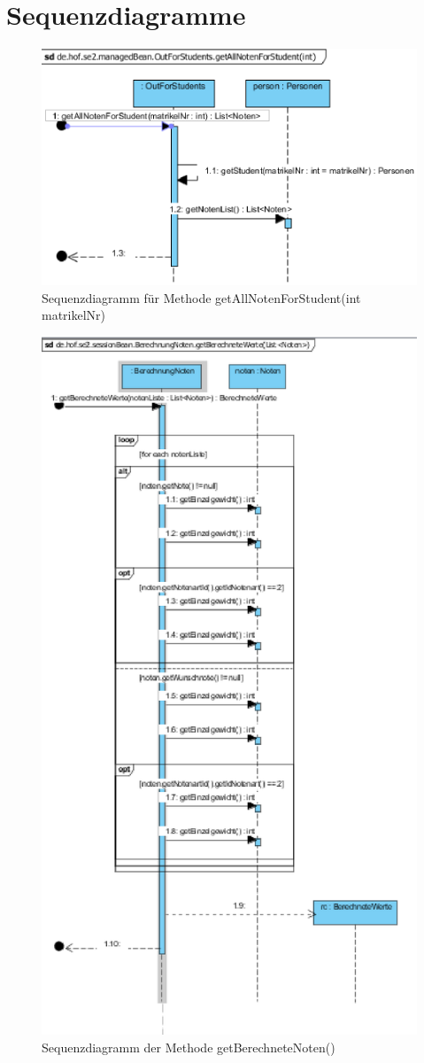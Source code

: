 \documentclass[12pt,a4paper,parskip]{scrreprt}
\begin{document}
\section{Sequenzdiagramme}
\begin{figure}[h!]
	\centering
	\includegraphics[width=1\linewidth]{../VP/NotenStudent}
	\caption[Sequenzdiagramm getAllNotenForStudent]{Sequenzdiagramm für Methode getAllNotenForStudent(int matrikelNr)}
	\label{fig:NotenStudent}
\end{figure}
\begin{figure}[!h]
\centering
\includegraphics[width=0.7\linewidth]{../VP/getBerechneteNoten}
\caption[Sequenzdiagramm getBerechneteNoten()]{Sequenzdiagramm der Methode getBerechneteNoten()}
\label{fig:getBerechneteNoten}
\end{figure}
\end{document}
